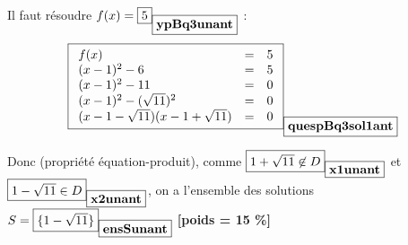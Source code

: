 \documentclass[10pt,a4paper]{article}
\newcommand{\poids}[1]{ {\bf [poids = #1 \%]}}
\newcommand{\var}[2]{\fbox{$#2$}_{\fbox{\mbox{\bf #1}}}}
\begin{document}
\begin{description}
{Il faut résoudre $f(x)=\var{ypBq3unant}{5}$ : 
$$
\var{quespBq3sol1ant}{
\begin{array}{lll}
 f(x) &=&5 \\
 (x-1)^2 -6  &=&5 \\
  (x-1)^2 -11  &=&0 \\
 (x-1)^2 -(\sqrt{11})^2  &=&0 \\
 (x-1-\sqrt{11})  (x-1+\sqrt{11}) &=&0 
\end{array}
}
$$

Donc (propriété équation-produit), comme $\var{x1unant}{1+\sqrt{11}\not\in D}$ 
et $\var{x2unant}{1-\sqrt{11}\in D}$, on a l'ensemble des solutions 
$ S =\var{ensSunant}{ \{1-\sqrt{11} \}}$\poids{15} %
} %

\end{description}
\end{document}
